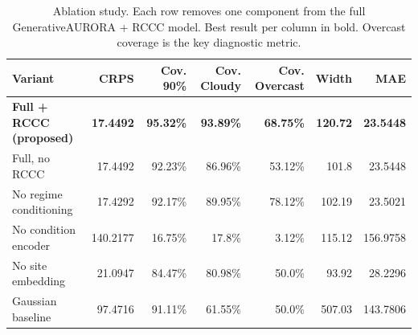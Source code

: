 \begin{table}[ht]
\centering
\caption{Ablation study. Each row removes one component from the full GenerativeAURORA + RCCC model. Best result per column in bold. Overcast coverage is the key diagnostic metric.}
\label{tab:ablation}
\begin{tabular}{lrrrrrr}
\toprule
Variant & CRPS & Cov. 90\% & Cov. Cloudy & Cov. Overcast & Width & MAE \\
\midrule
\textbf{Full + RCCC (proposed)} & \textbf{17.4492} & \textbf{95.32\%} & \textbf{93.89\%} & \textbf{68.75\%} & \textbf{120.72} & \textbf{23.5448} \\
Full, no RCCC & 17.4492 & 92.23\% & 86.96\% & 53.12\% & 101.8 & 23.5448 \\
No regime conditioning & 17.4292 & 92.17\% & 89.95\% & 78.12\% & 102.19 & 23.5021 \\
No condition encoder & 140.2177 & 16.75\% & 17.8\% & 3.12\% & 115.12 & 156.9758 \\
No site embedding & 21.0947 & 84.47\% & 80.98\% & 50.0\% & 93.92 & 28.2296 \\
Gaussian baseline & 97.4716 & 91.11\% & 61.55\% & 50.0\% & 507.03 & 143.7806 \\
\bottomrule
\end{tabular}
\end{table}